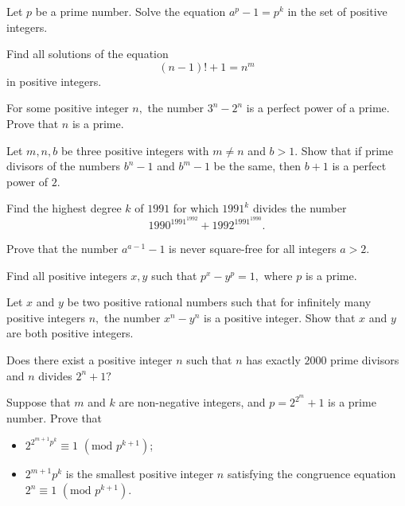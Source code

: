 \documentclass{subfile}
\begin{document}
	\begin{problem}
		Let $p$ be a prime number. Solve the equation $a^p-1 = p^k$ in the set of positive integers.
	\end{problem} 
	
	\begin{problem}
		Find all solutions of the equation
		\[(n-1)! + 1 = n^m\]
		in positive integers.
	\end{problem} 
	
	\begin{problem}[Bulgaria 1997]
		For some positive integer $n,$ the number $3^n-2^n$ is a perfect power of a prime. Prove that $n$ is a prime.
	\end{problem} 
	
	\begin{problem}
		Let $m,n,b$ be three positive integers with $m \neq n$ and $b>1.$ Show that if prime divisors of the numbers $b^n-1$ and $b^m-1$ be the same, then $b+1$ is a perfect power of $2.$
	\end{problem} 
	
	\begin{problem}
		Find the highest degree $ k$ of $ 1991$ for which $ 1991^k$ divides the number \[ 1990^{1991^{1992}} + 1992^{1991^{1990}}.\]
	\end{problem} 
	
	\begin{problem}
		Prove that the number $a^{a-1}-1$ is never square-free for all integers $a>2$.
	\end{problem}
	
	\begin{problem} 
		Find all positive integers $x,y$ such that $p^x - y^p=1,$ where $p$ is a prime.
	\end{problem}
	
	
	
	\begin{problem} 
		Let $x$ and $y$ be two positive rational numbers such that for infinitely many positive integers $n,$ the number $x^n-y^n$ is a positive integer. Show that $x$ and $y$ are both positive integers.
	\end{problem} 
	
	\begin{problem}[IMO 2000]
		Does there exist a positive integer $n$ such that $n$ has exactly $2000$ prime divisors and $n$ divides $2^n + 1?$
	\end{problem} 
	
	\begin{problem}
		Suppose that $m$ and $k$ are non-negative integers, and $p = 2^{2^m}+1$ is a prime number. Prove that
		\begin{itemize}
			\item $2^{2^{m+1}p^k} \equiv 1$ $(\text{mod } p^{k+1})$;
			\item $2^{m+1}p^k$ is the smallest positive integer $n$ satisfying the congruence equation $2^n \equiv 1$ $(\text{mod } p^{k+1})$.
		\end{itemize}
	\end{problem} 
	
\end{document}
